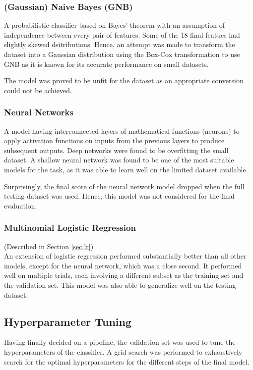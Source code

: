 \documentclass[conference]{IEEEtran}
\begin{document}
    \subsubsection{(Gaussian) Naive Bayes (GNB)}
    \label{sec:gnb}
    A probabilistic classifier based on Bayes' theorem with an assumption of independence between every pair of features.
    Some of the 18 final featues had slightly skewed dsitributions.
    Hence, an attempt was made to transform the dataset into a Gaussian distribution using the Box-Cox transformation to use GNB as it is known for its accurate performance on small datasets.

    The model was proved to be unfit for the dataset as an appropriate conversion could not be achieved.

    \subsubsection{Neural Networks}
    \label{sec:nn}
    A model having interconnected layers of mathematical functions (neurons) to apply activation functions on inputs from the previous layers to produce subsequent outputs.
    Deep networks were found to be overfitting the small dataset.
    A shallow neural network was found to be one of the most suitable models for the task, as it was able to learn well on the limited dataset available.

    Surprisingly, the final score of the neural network model dropped when the full testing dataset was used.
    Hence, this model was not considered for the final evaluation.

    \subsubsection{Multinomial Logistic Regression}
    (Described in Section \ref{sec:lr}) \\
    An extension of logistic regression performed substantially better than all other models, except for the neural network, which
    was a close second.
    It performed well on multiple trials, each involving a different subset as the training set and the validation set.
    This model was also able to generalize well on the testing dataset.

    \subsection{Hyperparameter Tuning}
    \label{sec:hyperparam}
    Having finally decided on a pipeline, the validation set was used to tune the hyperparameters of the classifier.
    A grid search was performed to exhaustively search for the optimal hyperparameters for the different steps of the final model.
\end{document}
